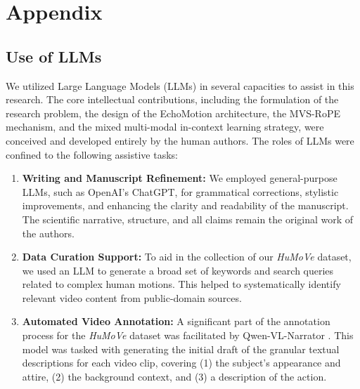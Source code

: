 \appendix
\section{Appendix}

\subsection{Use of LLMs}
We utilized Large Language Models (LLMs) in several capacities to assist in this research. The core intellectual contributions, including the formulation of the research problem, the design of the EchoMotion architecture, the MVS-RoPE mechanism, and the mixed multi-modal in-context learning strategy, were conceived and developed entirely by the human authors. The roles of LLMs were confined to the following assistive tasks:

\begin{enumerate}
    \item \textbf{Writing and Manuscript Refinement:} We employed general-purpose LLMs, such as OpenAI's ChatGPT, for grammatical corrections, stylistic improvements, and enhancing the clarity and readability of the manuscript. The scientific narrative, structure, and all claims remain the original work of the authors.

    \item \textbf{Data Curation Support:} To aid in the collection of our \textit{HuMoVe} dataset, we used an LLM to generate a broad set of keywords and search queries related to complex human motions. This helped to systematically identify relevant video content from public-domain sources.

    \item \textbf{Automated Video Annotation:} A significant part of the annotation process for the \textit{HuMoVe} dataset was facilitated by Qwen-VL-Narrator \citep{qwen-vl-narrator}. This model was tasked with generating the initial draft of the granular textual descriptions for each video clip, covering (1) the subject's appearance and attire, (2) the background context, and (3) a description of the action.
\end{enumerate}

